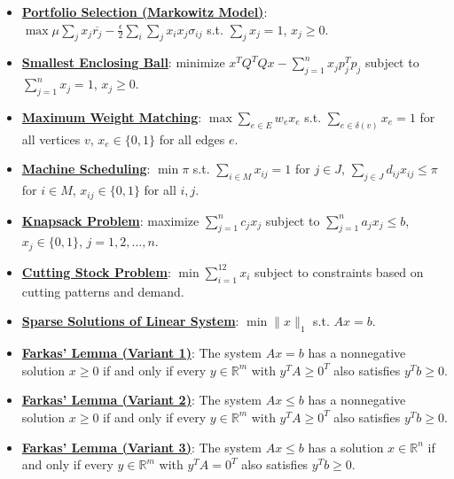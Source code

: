 \documentclass{article}%
\begin{document}
\begin{itemize}[leftmargin=*]
\item \href{https://www.math.purdue.edu/~yipn/421/2024-10-28-ApplsLinProg.pdf#page=16}{\textbf{Portfolio Selection (Markowitz Model)}}: $\max \mu \sum_{j} x_j \overline{r_j} - \frac{\epsilon}{2} \sum_{i} \sum_{j} x_i x_j \sigma_{ij}$ s.t. $\sum_{j} x_j = 1$, $x_j \ge 0$.%
\item \href{https://www.math.purdue.edu/~yipn/421/2024-10-28-ApplsLinProg.pdf#page=18}{\textbf{Smallest Enclosing Ball}}: minimize $x^T Q^T Q x - \sum_{j=1}^n x_j p_j^T p_j$ subject to $\sum_{j=1}^n x_j = 1$, $x_j \ge 0$.%
\item \href{https://www.math.purdue.edu/~yipn/421/2024-10-28-ApplsLinProg.pdf#page=21}{\textbf{Maximum Weight Matching}}: $\max \sum_{e \in E} w_e x_e$ s.t. $\sum_{e \in \delta(v)} x_e = 1$ for all vertices $v$, $x_e \in \{0, 1\}$ for all edges $e$.%
\item \href{https://www.math.purdue.edu/~yipn/421/2024-10-28-ApplsLinProg.pdf#page=23}{\textbf{Machine Scheduling}}: $\min \pi$ s.t. $\sum_{i \in M} x_{ij} = 1$ for $j \in J$, $\sum_{j \in J} d_{ij} x_{ij} \le \pi$ for $i \in M$, $x_{ij} \in \{0, 1\}$ for all $i, j$.%
\item \href{https://www.math.purdue.edu/~yipn/421/2024-10-28-ApplsLinProg.pdf#page=24}{\textbf{Knapsack Problem}}: maximize $\sum_{j=1}^n c_j x_j$ subject to $\sum_{j=1}^n a_j x_j \le b$, $x_j \in \{0, 1\}$, $j = 1, 2, \dots, n$.%
\item \href{https://www.math.purdue.edu/~yipn/421/2024-10-28-ApplsLinProg.pdf#page=29}{\textbf{Cutting Stock Problem}}: $\min \sum_{i=1}^{12} x_i$ subject to constraints based on cutting patterns and demand.%
\item \href{https://www.math.purdue.edu/~yipn/421/2024-10-28-ApplsLinProg.pdf#page=34}{\textbf{Sparse Solutions of Linear System}}: $\min \|x\|_1$ s.t. $Ax = b$.%
\item \href{https://www.math.purdue.edu/~yipn/421/2024-10-28-Farkas.pdf#page=4}{\textbf{Farkas' Lemma (Variant 1)}}: The system $Ax = b$ has a nonnegative solution $x \ge 0$ if and only if every $y \in \mathbb{R}^m$ with $y^T A \ge 0^T$ also satisfies $y^T b \ge 0$.%
\item \href{https://www.math.purdue.edu/~yipn/421/2024-10-28-Farkas.pdf#page=4}{\textbf{Farkas' Lemma (Variant 2)}}: The system $Ax \le b$ has a nonnegative solution $x \ge 0$ if and only if every $y \in \mathbb{R}^m$ with $y^T A \ge 0^T$ also satisfies $y^T b \ge 0$.%
\item \href{https://www.math.purdue.edu/~yipn/421/2024-10-28-Farkas.pdf#page=4}{\textbf{Farkas' Lemma (Variant 3)}}: The system $Ax \le b$ has a solution $x \in \mathbb{R}^n$ if and only if every $y \in \mathbb{R}^m$ with $y^T A = 0^T$ also satisfies $y^T b \ge 0$.%

\end{itemize}
\end{document}
